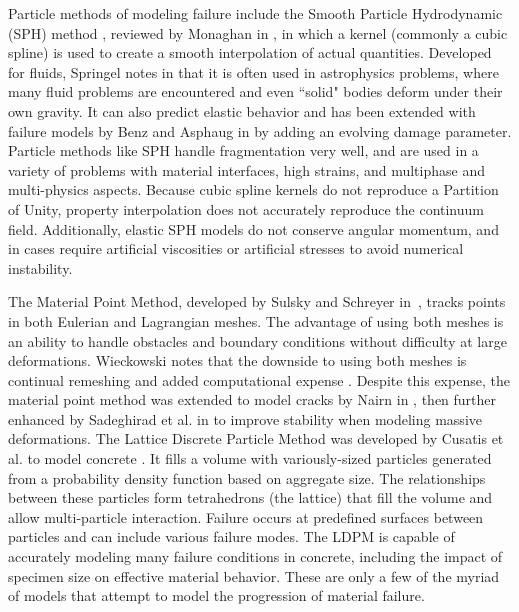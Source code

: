 Particle methods of modeling failure include the Smooth Particle Hydrodynamic (SPH) method , reviewed by Monaghan in \cite{monaghan2005smoothed}, in which a kernel (commonly a cubic spline) is used to create a smooth interpolation of actual quantities.
Developed for fluids, Springel notes in \cite{springel2010smoothed} that it is often used in astrophysics problems, where many fluid problems are encountered and even ``solid" bodies deform under their own gravity.
It can also predict elastic behavior and has been extended with failure models by Benz and Asphaug in \cite{benz1995simulations} by adding an evolving damage parameter.
Particle methods like SPH handle fragmentation very well, and are used in a variety of problems with material interfaces, high strains, and multiphase and multi-physics aspects.
Because cubic spline kernels do not reproduce a Partition of Unity, property interpolation does not accurately reproduce the continuum field.
Additionally, elastic SPH models do not conserve angular momentum, and in cases require artificial viscosities or artificial stresses to avoid numerical instability.

The Material Point Method, developed by Sulsky and Schreyer in~\cite{sulsky1996axisymmetric}, tracks points in both Eulerian and Lagrangian meshes.
The advantage of using both meshes is an ability to handle obstacles and boundary conditions without difficulty at large deformations.
Wieckowski notes that the downside to using both meshes is continual remeshing and added computational expense \cite{wikeckowski2004material}.
Despite this expense, the material point method was extended to model cracks by Nairn in \cite{nairn2003material}, then further enhanced by Sadeghirad et al. in \cite{sadeghirad2011convected} to improve stability when modeling massive deformations.
The Lattice Discrete Particle Method was developed by Cusatis et al.\cite{cusatis2011lattice,cusatis2011blattice} to model concrete .
It fills a volume with variously-sized particles generated from a probability density function based on aggregate size.
The relationships between these particles form tetrahedrons (the lattice) that fill the volume and allow multi-particle interaction.
Failure occurs at predefined surfaces between particles and can include various failure modes.
The LDPM is capable of accurately modeling many failure conditions in concrete, including the impact of specimen size on effective material behavior.
These are only a few of the myriad of models that attempt to model the progression of material failure.

